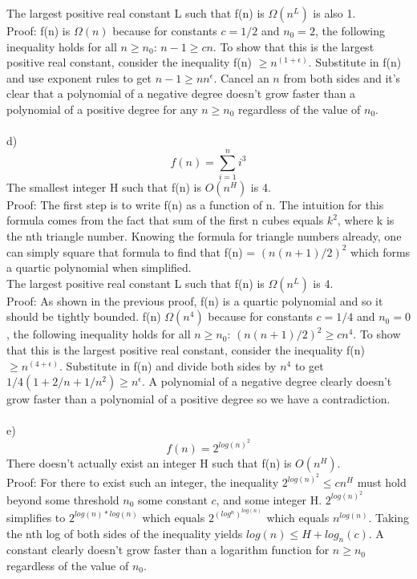 \documentclass{article}
\begin{document}
The largest positive real constant L such that f(n) is $\Omega(n^L)$ is also 1.\\ Proof: f(n) is $\Omega(n)$ because for constants $c = 1/2$ and $n_0 = 2$, the following inequality holds for all $n \geq n_0$: $n - 1 \geq cn$. To show that this is the largest positive real constant, consider the inequality f(n) $\geq n^{(1 + \epsilon)}$. Substitute in f(n) and use exponent rules to get $n - 1 \geq nn^{\epsilon}$. Cancel an $n$ from both sides and it's clear that a polynomial of a negative degree doesn't grow faster than a polynomial of a positive degree for any $n \geq n_0$ regardless of the value of $n_0$.\\\\

d) \[f(n) = \sum_{i=1}^{n} i^3\] The smallest integer H such that f(n) is $O(n^H)$ is 4.\\ Proof: The first step is to write f(n) as a function of n. The intuition for this formula comes from the fact that sum of the first n cubes equals $k^2$, where k is the nth triangle number. Knowing the formula for triangle numbers already, one can simply square that formula to find that f(n) = $(n(n + 1)/2)^2$ which forms a quartic polynomial when simplified.\\
The largest positive real constant L such that f(n) is $\Omega(n^L)$ is 4.\\ Proof: As shown in the previous proof, f(n) is a quartic polynomial and so it should be tightly bounded. f(n) $\Omega(n^4)$ because for constants $c = 1/4$ and $n_0 = 0$, the following inequality holds for all $n \geq n_0$: $(n(n + 1)/2)^2 \geq cn^4$. To show that this is the largest positive real constant, consider the inequality f(n) $\geq n^{(4 + \epsilon)}$. Substitute in f(n) and divide both sides by $n^4$ to get $1/4(1 + 2/n + 1/n^2) \geq n^{\epsilon}$. A polynomial of a negative degree clearly doesn't grow faster than a polynomial of a positive degree so we have a contradiction.\\\\

e) \[f(n) = 2^{log(n)^2}\] There doesn't actually exist an integer H such that f(n) is $O(n^H)$.\\ Proof: For there to exist such an integer, the inequality $2^{log(n)^2} \leq cn^H$ must hold beyond some threshold $n_0$ some constant $c$, and some integer H. $2^{log(n)^2}$ simplifies to $2^{log(n)*log(n)}$ which equals $2^{(log^n)^{log(n)}}$ which equals $n^{log(n)}$. Taking the nth log of both sides of the inequality yields $log(n) \leq H + log_n(c)$. A constant clearly doesn't grow faster than a logarithm function for $n \geq n_0$ regardless of the value of $n_0$.\\
\end{document}
